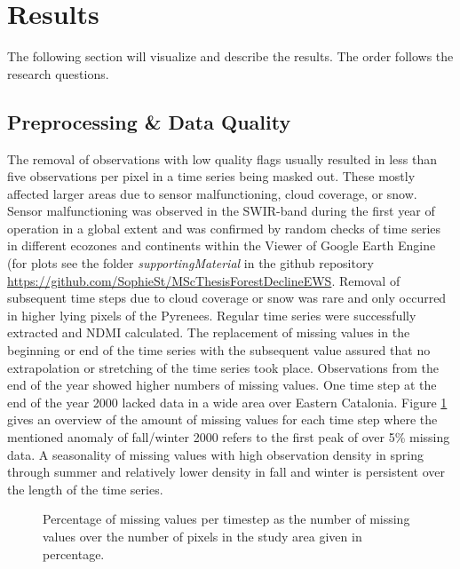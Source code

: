 \section{Results}\label{results}
The following section will visualize and describe the results. The order follows the research questions.

\subsection{Preprocessing \& Data Quality}\label{res_preproc}
The removal of observations with low quality flags usually resulted in less than five observations per pixel in a time series being masked out. These mostly affected larger areas due to sensor malfunctioning, cloud coverage, or snow. Sensor malfunctioning was observed in the SWIR-band during the first year of operation in a global extent and was confirmed by random checks of time series in different ecozones and continents within the Viewer of Google Earth Engine (for plots see the folder \textit{supportingMaterial} in the github repository \url{https://github.com/SophieSt/MScThesisForestDeclineEWS}. Removal of subsequent time steps due to cloud coverage or snow was rare and only occurred in higher lying pixels of the Pyrenees. Regular time series were successfully extracted and NDMI calculated. The replacement of missing values in the beginning or end of the time series with the subsequent value assured that no extrapolation or stretching of the time series took place. Observations from the end of the year showed higher numbers of missing values. One time step at the end of the year 2000 lacked data in a wide area over Eastern Catalonia. Figure \ref{res:no_NA} gives an overview of the amount of missing values for each time step where the mentioned anomaly of fall/winter 2000 refers to the first peak of over 5\% missing data. A seasonality of missing values with high observation density in spring through summer and relatively lower density in fall and winter is persistent over the length of the time series.\\

\begin{figure}[H]
	\centering
	\caption{Percentage of missing values per timestep as the number of missing values over the number of pixels in the study area given in percentage.}\label{res:no_NA}
\end{figure}



